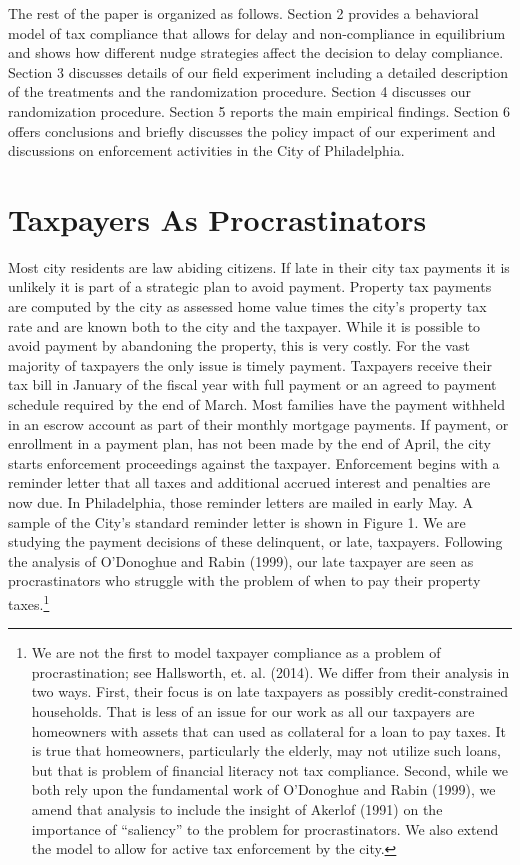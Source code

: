 \documentclass[12pt]{article}
\begin{document}
The rest of the paper is organized as follows.  Section 2 provides a
behavioral model of tax compliance that allows for delay and
non-compliance in equilibrium and shows how different nudge strategies
affect the decision to delay compliance. Section 3 discusses details
of our field experiment including a detailed description of the
treatments and the randomization procedure. Section 4 discusses our
randomization procedure.  Section 5 reports the main empirical
findings. Section 6 offers conclusions and briefly discusses the
policy impact of our experiment and discussions on enforcement
activities in the City of Philadelphia.

\section{Taxpayers As Procrastinators}

Most city residents are law abiding citizens.  If late in their city
tax payments it is unlikely it is part of a strategic plan to avoid
payment.  Property tax payments are computed by the city as assessed
home value times the city's property tax rate and are known both to
the city and the taxpayer.  While it is possible to avoid payment by
abandoning the property, this is very costly.  For the vast majority
of taxpayers the only issue is timely payment.  Taxpayers receive
their tax bill in January of the fiscal year with full payment or an
agreed to payment schedule required by the end of March.  Most
families have the payment withheld in an escrow account as part of
their monthly mortgage payments.  If payment, or enrollment in a
payment plan, has not been made by the end of April, the city starts
enforcement proceedings against the taxpayer.  Enforcement begins with
a reminder letter that all taxes and additional accrued interest and
penalties are now due.  In Philadelphia, those reminder letters are
mailed in early May.  A sample of the City's standard reminder letter
is shown in Figure 1.  We are studying the payment decisions of these
delinquent, or late, taxpayers. Following the analysis of O'Donoghue
and Rabin (1999), our late taxpayer are seen as procrastinators who
struggle with the problem of when to pay their property
taxes.\footnote{We are not the first to model taxpayer compliance as a
  problem of procrastination; see Hallsworth, et. al.  (2014). We
  differ from their analysis in two ways.  First, their focus is on
  late taxpayers as possibly credit-constrained households.  That is
  less of an issue for our work as all our taxpayers are homeowners
  with assets that can used as collateral for a loan to pay taxes.  It
  is true that homeowners, particularly the elderly, may not utilize
  such loans, but that is problem of financial literacy not tax
  compliance.  Second, while we both rely upon the fundamental work of
  O'Donoghue and Rabin (1999), we amend that analysis to include the
  insight of Akerlof (1991) on the importance of ``saliency'' to the
  problem for procrastinators. We also extend the model to allow for
  active tax enforcement by the city.}
\end{document}
